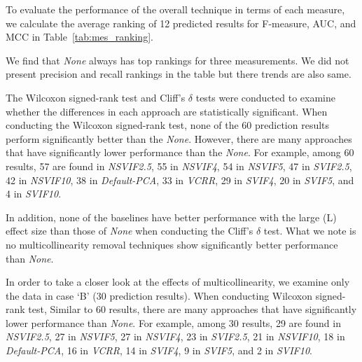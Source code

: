 To evaluate the performance of the overall technique in terms of each measure, we calculate the average ranking of 12 predicted results for F-measure, AUC, and MCC in Table~\ref{tab:mes_ranking}.

We find that \emph{None} always has top rankings for three measurements. We did not present precision and recall rankings in the table but there trends are also same.

The Wilcoxon signed-rank test and Cliff's $\delta$ tests were conducted to examine whether the differences in each approach are statistically significant. When conducting the Wilcoxon signed-rank test, none of the 60 prediction results perform significantly better than the \emph{None}. However, there are many approaches that have significantly lower performance than the \emph{None}. For example, among 60 results, 57 are found in \emph{NSVIF2.5}, 55 in \emph{NSVIF4}, 54 in \emph{NSVIF5}, 47 in \emph{SVIF2.5}, 42 in \emph{NSVIF10}, 38 in \emph{Default-PCA}, 33 in \emph{VCRR}, 29 in \emph{SVIF4}, 20 in \emph{SVIF5}, and 4 in \emph{SVIF10}.

In addition, none of the baselines have better performance with the large (L) effect size than those of \emph{None} when conducting the Cliff's $\delta$ test. What we note is no multicollinearity removal techniques show significantly better performance than \emph{None}.

In order to take a closer look at the effects of multicollinearity, we examine only the data in case `B' (30 prediction results). When conducting Wilcoxon signed-rank test, Similar to 60 results, there are many approaches that have significantly lower performance than \emph{None}. For example, among 30 results, 29 are found in \emph{NSVIF2.5}, 27 in \emph{NSVIF5}, 27 in \emph{NSVIF4}, 23 in \emph{SVIF2.5}, 21 in \emph{NSVIF10}, 18 in \emph{Default-PCA}, 16 in \emph{VCRR}, 14 in \emph{SVIF4}, 9 in \emph{SVIF5}, and 2 in \emph{SVIF10}.

